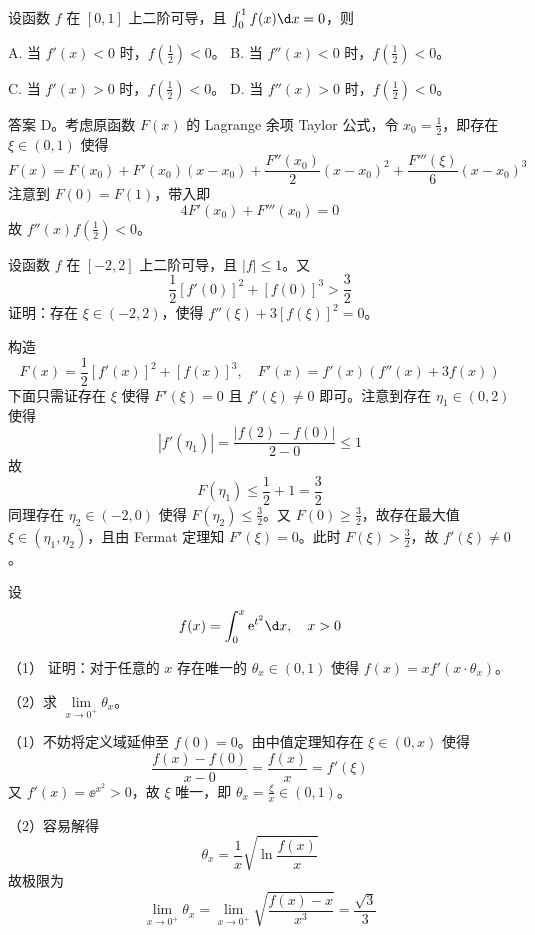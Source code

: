 \begin{problem}[000023]
设函数 $f$ 在 $[0, 1]$ 上二阶可导，且 $\int_{0}^{1} f(x) \d x = 0$，则

A. 当 $f'(x) < 0$ 时，$f(\frac{1}{2}) < 0$。
B. 当 $f''(x) < 0$ 时，$f(\frac{1}{2}) < 0$。

C. 当 $f'(x) > 0$ 时，$f(\frac{1}{2}) < 0$。
D. 当 $f''(x) > 0$ 时，$f(\frac{1}{2}) < 0$。
\end{problem}

\begin{solution}
	答案 D。考虑原函数 $F(x)$ 的 Lagrange 余项 Taylor 公式，令 $x_0 = \frac{1}{2}$，即存在 $\xi \in (0, 1)$ 使得
	\[ F(x) = F(x_0) + F'(x_0)(x-x_0) + \frac{F''(x_0)}{2}(x-x_0)^2 + \frac{F'''(\xi)}{6}(x-x_0)^3 \]
	注意到 $F(0) = F(1)$，带入即
	\[ 4 F'(x_0) + F'''(x_0) = 0 \]
	故 $f''(x) f(\frac{1}{2}) < 0$。
\end{solution}


\begin{problem}[000024]
设函数 $f$ 在 $[-2, 2]$ 上二阶可导，且 $|f| \leqslant 1$。又
\[ \frac{1}{2}[f'(0)]^2 + [f(0)]^3 > \frac{3}{2} \]
证明：存在 $\xi \in (-2,2)$，使得 $f''(\xi) + 3[f(\xi)]^2 = 0$。
\end{problem}

\begin{solution}
	构造
	\[ F(x) = \frac{1}{2}[f'(x)]^2 + [f(x)]^3,\quad F'(x) = f'(x)(f''(x) + 3f(x)) \]
	下面只需证存在 $\xi$ 使得 $F'(\xi) = 0$ 且 $f'(\xi) \neq 0$ 即可。注意到存在 $\eta_1 \in (0, 2)$ 使得
	\[ |f'(\eta_1)| = \frac{|f(2) - f(0)|}{2 - 0} \leqslant 1 \]
	故
	\[ F(\eta_1) \leqslant \frac{1}{2} + 1 = \frac{3}{2} \]
	同理存在 $\eta_2 \in (-2, 0)$ 使得 $F(\eta_2) \leqslant \frac{3}{2}$。又 $F(0) \geqslant \frac{3}{2}$，故存在最大值 $\xi \in (\eta_1, \eta_2)$，且由 Fermat 定理知 $F'(\xi) = 0$。此时 $F(\xi) > \frac{3}{2}$，故 $f'(\xi) \neq 0$。
\end{solution}


\begin{problem}[000025]
设
\[ f(x) = \int_{0}^{x} \ee^{t^2} \d x, \quad x > 0 \]

（1） 证明：对于任意的 $x$ 存在唯一的 $\theta_x \in (0, 1)$ 使得 $f(x) = x f'(x \cdot \theta_x)$。

（2）求 $\lim\limits_{x \to 0^+} \theta_x$。
\end{problem}

\begin{solution}
	（1）不妨将定义域延伸至 $f(0) = 0$。由中值定理知存在 $\xi \in (0, x)$ 使得
	\[ \frac{f(x) - f(0)}{x - 0} = \frac{f(x)}{x} = f'(\xi) \]
	又 $f'(x) = \ee^{x^2} > 0$，故 $\xi$ 唯一，即 $\theta_x = \frac{\xi}{x} \in (0, 1)$。

	（2）容易解得
	\[ \theta_x = \frac{1}{x} \sqrt{\ln \frac{f(x)}{x}} \]
	故极限为
	\[ \lim_{x \to 0^+} \theta_x = \lim_{x \to 0^+} \sqrt{\frac{f(x) - x}{x^3}} = \frac{\sqrt{3}}{3} \]
\end{solution}

